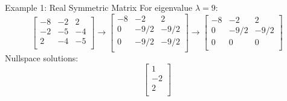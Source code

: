 \documentclass{beamer}
\begin{document}
\begin{frame}{Example 1: Real Symmetric Matrix}
    For eigenvalue $\lambda=9$:
\begin{equation*}
    \left[ \begin{matrix}
        -8&		-2&		2\\
        -2&		-5&		-4\\
        2&		-4&		-5\\
    \end{matrix} \right] \rightarrow \left[ \begin{matrix}
        -8&		-2&		2\\
        0&		-9/2&		-9/2\\
        0&		-9/2&		-9/2\\
    \end{matrix} \right] \rightarrow \left[ \begin{matrix}
        -8&		-2&		2\\
        0&		-9/2&		-9/2\\
        0&		0&		0\\
    \end{matrix} \right]
\end{equation*}
Nullspace solutions:
\begin{equation*}
    \left[ \begin{array}{c}
        1\\
        -2\\
        2\\
    \end{array} \right]
\end{equation*}
\end{frame}
\end{document}
